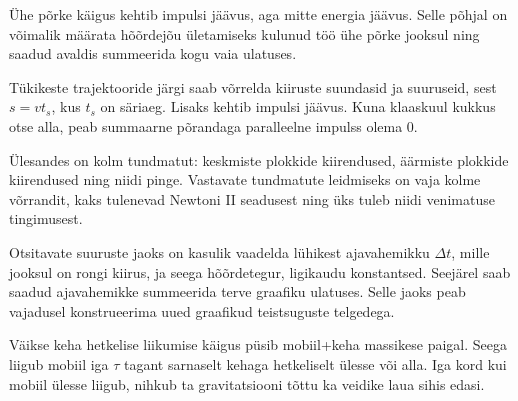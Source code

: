 \documentclass[10pt]{article}
\begin{document}
{%

\hint
Ühe põrke käigus kehtib impulsi jäävus, aga mitte energia jäävus. Selle põhjal on võimalik määrata hõõrdejõu ületamiseks kulunud töö ühe põrke jooksul ning saadud avaldis summeerida kogu vaia ulatuses.
\probend
\bigskip


\hint
Tükikeste trajektooride järgi saab võrrelda kiiruste suundasid ja suuruseid, sest $s = vt_s$, kus $t_s$ on säriaeg. Lisaks kehtib impulsi jäävus. Kuna klaaskuul kukkus otse alla, peab summaarne põrandaga paralleelne impulss olema 0.
\probend
\bigskip


\hint
Ülesandes on kolm tundmatut: keskmiste plokkide kiirendused, äärmiste plokkide kiirendused ning niidi pinge. Vastavate tundmatute leidmiseks on vaja kolme võrrandit, kaks tulenevad Newtoni II seadusest ning üks tuleb niidi venimatuse tingimusest.
\probend
\bigskip


\hint
Otsitavate suuruste jaoks on kasulik vaadelda lühikest ajavahemikku $\Delta t$, mille jooksul on rongi kiirus, ja seega hõõrdetegur, ligikaudu konstantsed. Seejärel saab saadud ajavahemikke summeerida terve graafiku ulatuses. Selle jaoks peab vajadusel konstrueerima uued graafikud teistsuguste telgedega.
\probend
\bigskip


\hint
Väikse keha hetkelise liikumise käigus püsib mobiil+keha massikese paigal. Seega liigub mobiil iga $\tau$ tagant sarnaselt kehaga hetkeliselt ülesse või alla. Iga kord kui mobiil ülesse liigub, nihkub ta gravitatsiooni tõttu ka veidike laua sihis edasi.
\probend
\bigskip


}
\end{document}
